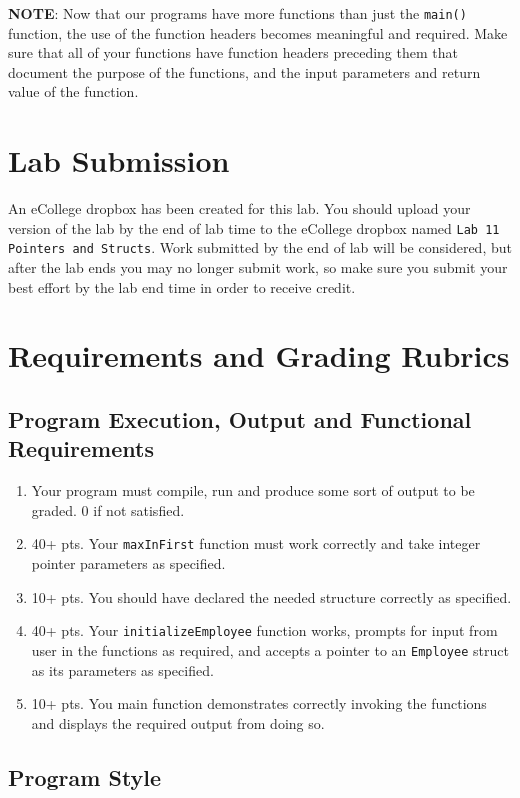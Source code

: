 \documentclass[11pt]{article}
\begin{document}
\textbf{NOTE}: Now that our programs have more functions than just the
\verb~main()~ function, the use of the function headers becomes meaningful
and required.  Make sure that all of your functions have function
headers preceding them that document the purpose of the functions, and
the input parameters and return value of the function.
\section*{Lab Submission}
\label{sec-4}


An eCollege dropbox has been created for this lab.  You should upload
your version of the lab by the end of lab time to the eCollege dropbox
named \verb~Lab 11 Pointers and Structs~.  Work submitted by the end of
lab will be considered, but after the lab ends you may no longer
submit work, so make sure you submit your best effort by the lab end
time in order to receive credit.
\section*{Requirements and Grading Rubrics}
\label{sec-5}
\subsection*{Program Execution, Output and Functional Requirements}
\label{sec-5-1}


\begin{enumerate}
\item Your program must compile, run and produce some sort of output to be
  graded. 0 if not satisfied.
\item 40+ pts.  Your \verb~maxInFirst~ function must work correctly and take
   integer pointer parameters as specified.
\item 10+ pts.  You should have declared the needed structure correctly as
   specified.
\item 40+ pts.  Your \verb~initializeEmployee~ function works, prompts for
   input from user in the functions as required, and accepts a pointer
   to an \verb~Employee~ struct as its parameters as specified.
\item 10+ pts. You main function demonstrates correctly invoking the functions
   and displays the required output from doing so.
\end{enumerate}
\subsection*{Program Style}
\label{sec-5-2}
\end{document}

